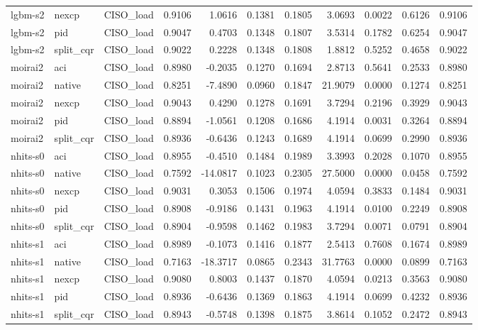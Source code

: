 \begin{tabular}{lllrrrrrrrr}
lgbm-s2 & nexcp & CISO_load & 0.9106 & 1.0616 & 0.1381 & 0.1805 & 3.0693 & 0.0022 & 0.6126 & 0.9106 \\
lgbm-s2 & pid & CISO_load & 0.9047 & 0.4703 & 0.1348 & 0.1807 & 3.5314 & 0.1782 & 0.6254 & 0.9047 \\
lgbm-s2 & split_cqr & CISO_load & 0.9022 & 0.2228 & 0.1348 & 0.1808 & 1.8812 & 0.5252 & 0.4658 & 0.9022 \\
moirai2 & aci & CISO_load & 0.8980 & -0.2035 & 0.1270 & 0.1694 & 2.8713 & 0.5641 & 0.2533 & 0.8980 \\
moirai2 & native & CISO_load & 0.8251 & -7.4890 & 0.0960 & 0.1847 & 21.9079 & 0.0000 & 0.1274 & 0.8251 \\
moirai2 & nexcp & CISO_load & 0.9043 & 0.4290 & 0.1278 & 0.1691 & 3.7294 & 0.2196 & 0.3929 & 0.9043 \\
moirai2 & pid & CISO_load & 0.8894 & -1.0561 & 0.1208 & 0.1686 & 4.1914 & 0.0031 & 0.3264 & 0.8894 \\
moirai2 & split_cqr & CISO_load & 0.8936 & -0.6436 & 0.1243 & 0.1689 & 4.1914 & 0.0699 & 0.2990 & 0.8936 \\
nhits-s0 & aci & CISO_load & 0.8955 & -0.4510 & 0.1484 & 0.1989 & 3.3993 & 0.2028 & 0.1070 & 0.8955 \\
nhits-s0 & native & CISO_load & 0.7592 & -14.0817 & 0.1023 & 0.2305 & 27.5000 & 0.0000 & 0.0458 & 0.7592 \\
nhits-s0 & nexcp & CISO_load & 0.9031 & 0.3053 & 0.1506 & 0.1974 & 4.0594 & 0.3833 & 0.1484 & 0.9031 \\
nhits-s0 & pid & CISO_load & 0.8908 & -0.9186 & 0.1431 & 0.1963 & 4.1914 & 0.0100 & 0.2249 & 0.8908 \\
nhits-s0 & split_cqr & CISO_load & 0.8904 & -0.9598 & 0.1462 & 0.1983 & 3.7294 & 0.0071 & 0.0791 & 0.8904 \\
nhits-s1 & aci & CISO_load & 0.8989 & -0.1073 & 0.1416 & 0.1877 & 2.5413 & 0.7608 & 0.1674 & 0.8989 \\
nhits-s1 & native & CISO_load & 0.7163 & -18.3717 & 0.0865 & 0.2343 & 31.7763 & 0.0000 & 0.0899 & 0.7163 \\
nhits-s1 & nexcp & CISO_load & 0.9080 & 0.8003 & 0.1437 & 0.1870 & 4.0594 & 0.0213 & 0.3563 & 0.9080 \\
nhits-s1 & pid & CISO_load & 0.8936 & -0.6436 & 0.1369 & 0.1863 & 4.1914 & 0.0699 & 0.4232 & 0.8936 \\
nhits-s1 & split_cqr & CISO_load & 0.8943 & -0.5748 & 0.1398 & 0.1875 & 3.8614 & 0.1052 & 0.2472 & 0.8943 \\

\end{tabular}
